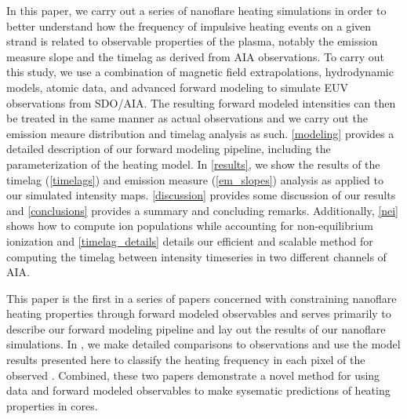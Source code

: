 In this paper, we carry out a series of nanoflare heating simulations in order to better understand how the frequency of impulsive heating events on a given strand is related to observable properties of the plasma, notably the emission measure slope and the timelag as derived from AIA observations. To carry out this study, we use a combination of magnetic field extrapolations, hydrodynamic models, atomic data, and advanced forward modeling to simulate EUV observations from SDO/AIA. The resulting forward modeled intensities can then be treated in the same manner as actual observations and we carry out the emission meaure distribution and timelag analysis as such. \autoref{modeling} provides a detailed description of our forward modeling pipeline, including the parameterization of the heating model. In \autoref{results}, we show the results of the timelag (\autoref{timelags}) and emission measure (\autoref{em_slopes}) analysis as applied to our simulated intensity maps. \autoref{discussion} provides some discussion of our results and \autoref{conclusions} provides a summary and concluding remarks. Additionally, \autoref{nei} shows how to compute ion populations while accounting for non-equilibrium ionization and \autoref{timelag_details} details our efficient and scalable method for computing the timelag between intensity timeseries in two different channels of AIA.

This paper is the first in a series of papers concerned with constraining nanoflare heating properties through forward modeled observables and serves primarily to describe our forward modeling pipeline and lay out the results of our nanoflare simulations. In \citet[ hereafter]{barnes_understanding_2018-1}, we make detailed comparisons to observations and use the model results presented here to classify the heating frequency in each pixel of the observed \AR{}. Combined, these two papers demonstrate a novel method for using data and forward modeled observables to make sysematic predictions of heating properties in \AR{} cores.

